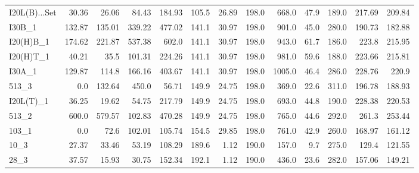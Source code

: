 \documentclass{article}
\begin{document}
\begin{table}[htb]
\begin{tabular}{lrrrrrrrrrrrr}
    I20L(B)...Set &  30.36 &  26.06 &  84.43 & 184.93 &           105.5 &        26.89 &                      198.0 &           668.0 &         47.9 &                      189.0 & 217.69 & 209.84 \\
    I30B\_1            & 132.87 & 135.01 & 339.22 & 477.02 &           141.1 &        30.97 &                      198.0 &           901.0 &         45.0 &                      280.0 & 190.73 & 182.88 \\
    I20(H)B\_1         & 174.62 & 221.87 & 537.38 &  602.0 &           141.1 &        30.97 &                      198.0 &           943.0 &         61.7 &                      186.0 &  223.8 & 215.95 \\
    I20(H)T\_1         &  40.21 &   35.5 & 101.31 & 224.26 &           141.1 &        30.97 &                      198.0 &           981.0 &         59.6 &                      188.0 & 223.66 & 215.81 \\
    I30A\_1            & 129.87 &  114.8 & 166.16 & 403.67 &           141.1 &        30.97 &                      198.0 &          1005.0 &         46.4 &                      286.0 & 228.76 &  220.9 \\
    513\_3             &    0.0 & 132.64 &  450.0 &  56.71 &           149.9 &        24.75 &                      198.0 &           369.0 &         22.6 &                      311.0 & 196.78 & 188.93 \\
    I20L(T)\_1         &  36.25 &  19.62 &  54.75 & 217.79 &           149.9 &        24.75 &                      198.0 &           693.0 &         44.8 &                      190.0 & 228.38 & 220.53 \\
    513\_2             &  600.0 & 579.57 & 102.83 & 470.28 &           149.9 &        24.75 &                      198.0 &           765.0 &         44.6 &                      292.0 &  261.3 & 253.44 \\
    103\_1             &    0.0 &   72.6 & 102.01 & 105.74 &           154.5 &        29.85 &                      198.0 &           761.0 &         42.9 &                      260.0 & 168.97 & 161.12 \\
    10\_3              &  27.37 &  33.46 &  53.19 & 108.29 &           189.6 &         1.12 &                      190.0 &           157.0 &          9.7 &                      275.0 &  129.4 & 121.55 \\
    28\_3              &  37.57 &  15.93 &  30.75 & 152.34 &           192.1 &         1.12 &                      190.0 &           436.0 &         23.6 &                      282.0 & 157.06 & 149.21 \\

\end{tabular}
\end{table}
\end{document}
